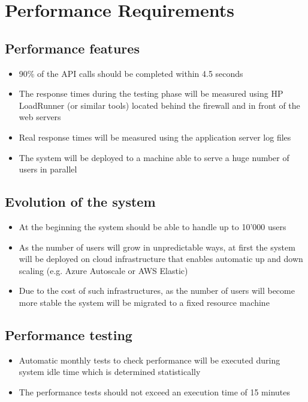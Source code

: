 \section{Performance Requirements}

\subsection{Performance features}
\begin{itemize}
    \item 90\% of the API calls should be completed within 4.5 seconds
    \item The response times during the testing phase will be measured using HP LoadRunner (or similar tools) located behind the firewall and in front of the web servers
    \item Real response times will be measured using the application server log files
    \item The system will be deployed to a machine able to serve a huge number of users in parallel
\end{itemize}

\subsection{Evolution of the system}
\begin{itemize}
    \item At the beginning the system should be able to handle up to 10'000 users
    \item As the number of users will grow in unpredictable ways, at first the system will be deployed on cloud infrastructure that enables automatic up and down scaling (e.g. Azure Autoscale or AWS Elastic)
    \item Due to the cost of such infrastructures, as the number of users will become more stable the system will be migrated to a fixed resource machine
\end{itemize}

\subsection{Performance testing}
\begin{itemize}
    \item Automatic monthly tests to check performance will be executed during system idle time which is determined statistically
    \item The performance tests should not exceed an execution time of 15 minutes
\end{itemize}